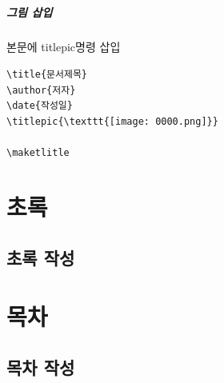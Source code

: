 \documentclass[12pt, a4paper, oneside]{book}
\let\stdsection\section
\renewcommand\section{\newpage\stdsection}
\begin{document}
		\paragraph{그림 삽입}
			본문에 titlepic명령 삽입
			\begin{leftbar}
			\verb|\title{문서제목}| \\
			\verb|\author{저자}| \\
			\verb|\date{작성일}| \\
			\verb|\titlepic{\texttt{[image: 0000.png]}}| \\
			\null \\
			\verb|\maketlitle|
			\end{leftbar}



	\chapter{초록}

		\minitoc				%
		\doublespace
	
		
	\newpage  \null
	\section{초록 작성}
	
	
	
	
	
	
	\chapter{목차}

		\minitoc				%
		\doublespace


	
	
	\newpage  \null
	\section{목차 작성}
\end{document}
